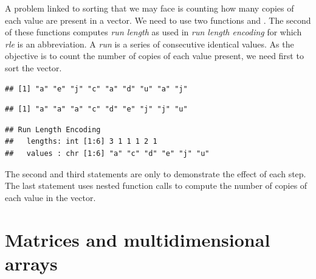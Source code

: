 \documentclass[krantz2]{krantz}\usepackage{knitr}
\begin{document}
\begin{explainbox}
A problem linked to sorting that we may face is counting how many copies of each value are present in a vector. We need to use two functions  and . The second of these functions computes \emph{run length} as used in \emph{run length encoding} for which \emph{rle} is an abbreviation. A \emph{run} is a series of consecutive identical values. As the objective is to count the number of copies of each value present, we need first to sort the vector.

\begin{knitrout}\footnotesize
{}\color{fgcolor}\begin{kframe}
\begin{alltt}
 \hlkwb{<-} \hlstd{letters[}\hlstd{(}\hlstd{,}\hlstd{,}\hlstd{,}\hlstd{,}\hlstd{,}\hlstd{,}\hlstd{,}\hlstd{,}\hlstd{)]}
\end{alltt}
\begin{verbatim}
## [1] "a" "e" "j" "c" "a" "d" "u" "a" "j"
\end{verbatim}
\begin{alltt}
\end{alltt}
\begin{verbatim}
## [1] "a" "a" "a" "c" "d" "e" "j" "j" "u"
\end{verbatim}
\begin{alltt}
\hlstd{(}
\end{alltt}
\begin{verbatim}
## Run Length Encoding
##   lengths: int [1:6] 3 1 1 1 2 1
##   values : chr [1:6] "a" "c" "d" "e" "j" "u"
\end{verbatim}
\end{kframe}
\end{knitrout}

The second and third statements are only to demonstrate the effect of each step. The last statement uses nested function calls to compute the number of copies of each value in the vector.
\end{explainbox}




\section{Matrices and multidimensional arrays}\label{sec:matrix:array}
\end{document}

